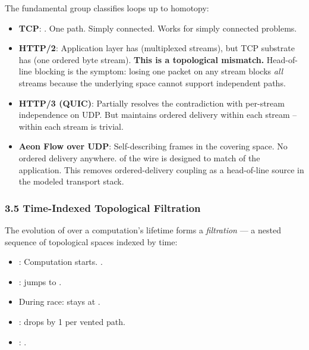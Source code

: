 \documentclass[
]{article}
\providecommand{\tightlist}{%
  \setlength{\itemsep}{0pt}\setlength{\parskip}{0pt}}
\begin{document}
The fundamental group classifies loops up to homotopy:

\begin{itemize}
\tightlist
\item
  \textbf{TCP}: . One path. Simply connected. Works for simply connected
  problems.\\
\item
  \textbf{HTTP/2}: Application layer has (multiplexed streams), but TCP
  substrate has (one ordered byte stream). \textbf{This is a topological
  mismatch.} Head-of-line blocking is the symptom: losing one packet on
  any stream blocks \emph{all} streams because the underlying space
  cannot support independent paths.\\
\item
  \textbf{HTTP/3 (QUIC)}: Partially resolves the contradiction with
  per-stream independence on UDP. But maintains ordered delivery within
  each stream -- within each stream is trivial.\\
\item
  \textbf{Aeon Flow over UDP}: Self-describing frames in the covering
  space. No ordered delivery anywhere. of the wire is designed to match
  of the application. This removes ordered-delivery coupling as a
  head-of-line source in the modeled transport stack.
\end{itemize}

\subsubsection{\texorpdfstring{\textbf{3.5 Time-Indexed Topological
Filtration}}{3.5 Time-Indexed Topological Filtration}}\label{time-indexed-topological-filtration}

The evolution of over a computation's lifetime forms a \emph{filtration}
--- a nested sequence of topological spaces indexed by time:

\begin{itemize}
\tightlist
\item
  : Computation starts. .\\
\item
  : jumps to .\\
\item
  During race: stays at .\\
\item
  : drops by 1 per vented path.\\
\item
  : .
\end{itemize}
\end{document}
